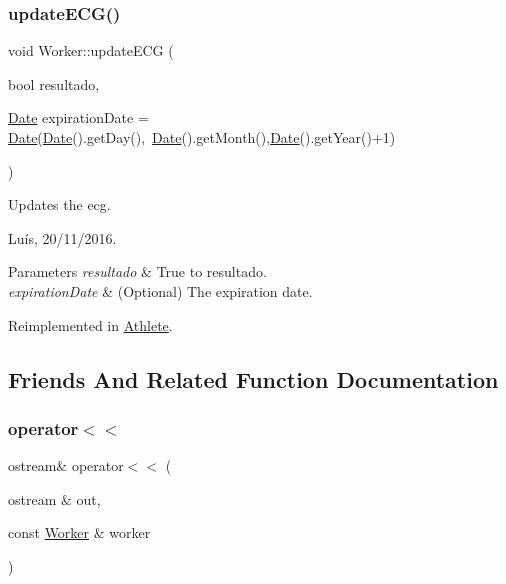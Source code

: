 \hypertarget{class_worker_a7d06c15a1d9872d629988aa054996627}{}\label{class_worker_a7d06c15a1d9872d629988aa054996627} 
\subsubsection{\texorpdfstring{update\+E\+C\+G()}{updateECG()}}
{\footnotesize\ttfamily void Worker\+::update\+E\+CG (\begin{DoxyParamCaption}\item[{bool}]{resultado,  }\item[{\hyperlink{class_date}{Date}}]{expiration\+Date = {\ttfamily \hyperlink{class_date}{Date}(\hyperlink{class_date}{Date}().getDay(),~\hyperlink{class_date}{Date}().getMonth(),\hyperlink{class_date}{Date}().getYear()+1)} }\end{DoxyParamCaption})\hspace{0.3cm}{\ttfamily [virtual]}}



Updates the ecg. 

Luís, 20/11/2016. 


\begin{DoxyParams}{Parameters}
{\em resultado} & True to resultado. \\
\hline
{\em expiration\+Date} & (Optional) The expiration date. \\
\hline
\end{DoxyParams}


Reimplemented in \hyperlink{class_athlete_a7eda9551e23db1e742a33e9ac61bd42d}{Athlete}.



\subsection{Friends And Related Function Documentation}
\hypertarget{class_worker_a8d1e3d13654b0c5466ec0560d2ab7c4e}{}\label{class_worker_a8d1e3d13654b0c5466ec0560d2ab7c4e} 
\subsubsection{\texorpdfstring{operator$<$$<$}{operator<<}}
{\footnotesize\ttfamily ostream\& operator$<$$<$ (\begin{DoxyParamCaption}\item[{ostream \&}]{out,  }\item[{const \hyperlink{class_worker}{Worker} \&}]{worker }\end{DoxyParamCaption})\hspace{0.3cm}{\ttfamily [friend]}}



